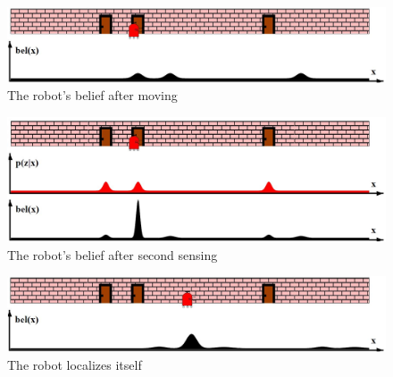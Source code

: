 \begin{figure}[H]
\centering
\includegraphics[scale=0.37]{images/MarkovLocalizationC}
\caption{The robot's belief after moving}
\label{fig:afterMoveBelief}
\end{figure}

\begin{figure}[H]
\centering
\includegraphics[scale=0.37]{images/MarkovLocalizationD}
\caption{The robot's belief after second sensing}
\label{fig:afterSecondSenseBelief}
\end{figure}

\begin{figure}[H]
\centering
\includegraphics[scale=0.37]{images/MarkovLocalizationE}
\caption{The robot localizes itself}
\label{fig:finalBelief}
\end{figure}